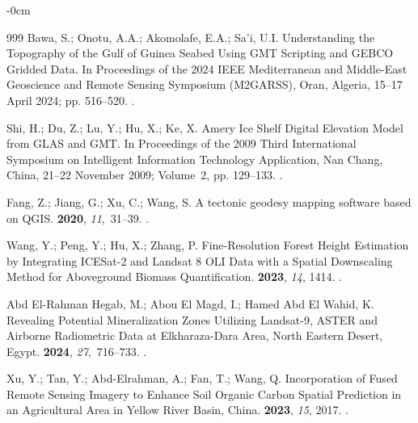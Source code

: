 \documentclass[geomatics,article,accept,pdftex,oneauthor]{Definitions/mdpi}
\begin{document}
\begin{adjustwidth}{-\extralength}{0cm}
\begin{thebibliography}{999}
Bawa, S.; Onotu, A.A.; Akomolafe, E.A.; Sa’i, U.I.
\newblock Understanding the Topography of the Gulf of Guinea Seabed Using GMT
  Scripting and GEBCO Gridded Data.
\newblock In Proceedings of the 2024 IEEE Mediterranean and Middle-East
  Geoscience and Remote Sensing Symposium (M2GARSS),  Oran, Algeria, 15--17 April 2024; pp. 516--520.
.


Shi, H.; Du, Z.; Lu, Y.; Hu, X.; Ke, X.
\newblock Amery Ice Shelf Digital Elevation Model from GLAS and GMT.
\newblock In Proceedings of the 2009 Third International Symposium on
  Intelligent Information Technology Application, Nan Chang, China, 21--22 November 2009; Volume~2, pp. 129--133.
. %

Fang, Z.; Jiang, G.; Xu, C.; Wang, S.
\newblock A tectonic geodesy mapping software based on QGIS.
 {\bf 2020}, {\em 11},~31--39.
.

Wang, Y.; Peng, Y.; Hu, X.; Zhang, P.
\newblock Fine-Resolution Forest Height Estimation by Integrating ICESat-2 and
  Landsat 8 OLI Data with a Spatial Downscaling Method for Aboveground Biomass
  Quantification.
 {\bf 2023}, {\em 14}, 1414.
.

{Abd El-Rahman Hegab}, M.; {Abou El Magd}, I.; {Hamed Abd El Wahid}, K.
\newblock Revealing Potential Mineralization Zones Utilizing Landsat-9, ASTER
  and Airborne Radiometric Data at Elkharaza-Dara Area, North Eastern Desert,
  Egypt.
 {\bf
  2024}, {\em 27},~716--733.
.

Xu, Y.; Tan, Y.; Abd-Elrahman, A.; Fan, T.; Wang, Q.
\newblock Incorporation of Fused Remote Sensing Imagery to Enhance Soil Organic
  Carbon Spatial Prediction in an Agricultural Area in Yellow River Basin,
  China.
 {\bf 2023}, {\em 15}, 2017.
.


\end{thebibliography}
\end{adjustwidth}
\end{document}
